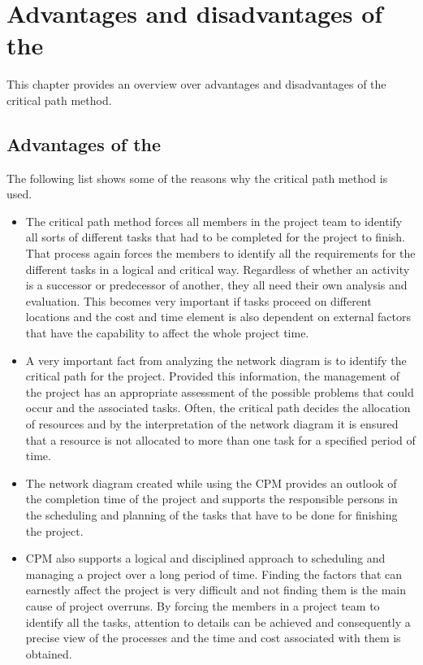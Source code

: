 \section{Advantages and disadvantages of the \cpm{}}

This chapter provides an overview over advantages and disadvantages of the critical path method.

\subsection{Advantages of the \cpm{}}

The following list shows some of the reasons why the critical path method is used.

\begin{itemize}
\item The critical path method forces all members in the project team to identify all sorts of different
tasks that had to be completed for the project to finish. That process again forces the members to
identify all the requirements for the different tasks in a logical and critical way. Regardless of
whether an activity is a successor or predecessor of another, they all need their own analysis and
evaluation. This becomes very important if tasks proceed on different locations and the cost and
time element is also dependent on external factors that have the capability to affect the whole
project time.

\item A very important fact from analyzing the network diagram is to identify the critical path for the
project. Provided this information, the management of the project has an appropriate assessment of
the possible problems that could occur and the associated tasks. Often, the critical path decides
the allocation of resources and by the interpretation of the network diagram it is ensured that a
resource is not allocated to more than one task for a specified period of time.

\item The network diagram created while using the CPM provides an outlook of the completion time of the
project and supports the responsible persons in the scheduling and planning of the tasks that have
to be done for finishing the project.

\item CPM also supports a logical and disciplined approach to scheduling and managing a project over a
long period of time. Finding the factors that can earnestly affect the project is very difficult and
not finding them is the main cause of project overruns. By forcing the members in a project team to
identify all the tasks, attention to details can be achieved and consequently a precise view of the
processes and the time and cost associated with them is obtained.


\end{itemize}
